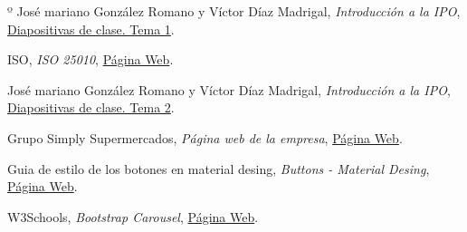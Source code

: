\documentclass[a4paper,11pt]{article}
\begin{document}
\begin{thebibliography}{99}
º
  José mariano González Romano y Víctor Díaz Madrigal,
  \textit{Introducción a la IPO},
  \href{https://s3-eu-central-1.amazonaws.com/learn-eu-central-1-prod-fleet01-xythos/5ac734ed505df/1497177?response-content-disposition=inline%3B%20filename%2A%3DUTF-8%27%27IPO-2018-19-01-Introducci%25C3%25B3n%2520a%2520la%2520IPO.pdf&response-content-type=application%2Fpdf&X-Amz-Algorithm=AWS4-HMAC-SHA256&X-Amz-Date=20181009T201303Z&X-Amz-SignedHeaders=host&X-Amz-Expires=21600&X-Amz-Credential=AKIAIZ3QX2YUHH4EOO3A%2F20181009%2Feu-central-1%2Fs3%2Faws4_request&X-Amz-Signature=91e59768c9f86b77180953691bdcae19f7300073d4ad74d0949de1515d0b6f55}{Diapositivas de clase. Tema 1}.

ISO,
\textit{ISO 25010},
\href{https://iso25000.com/index.php/normas-iso-25000/iso-25010/23-usabilidad}{Página Web}.

José mariano González Romano y Víctor Díaz Madrigal,
\textit{Introducción a la IPO},
\href{https://s3-eu-central-1.amazonaws.com/learn-eu-central-1-prod-fleet01-xythos/5ac734ed505df/1548262?response-content-disposition=inline%3B%20filename%2A%3DUTF-8%27%27IPO-2018-19-02-Usabilidad.pdf&response-content-type=application%2Fpdf&X-Amz-Algorithm=AWS4-HMAC-SHA256&X-Amz-Date=20181009T201947Z&X-Amz-SignedHeaders=host&X-Amz-Expires=21600&X-Amz-Credential=AKIAIZ3QX2YUHH4EOO3A%2F20181009%2Feu-central-1%2Fs3%2Faws4_request&X-Amz-Signature=b0015ef5189a68a14076abd0ef07c9f15c07aa1ef5bebf8a545bf456bbfafe84}{Diapositivas de clase. Tema 2}.

Grupo Simply Supermercados,
\textit{Página web de la empresa},
\href{www.simply.es}{Página Web}.

Guia de estilo de los botones en material desing,
\textit{Buttons - Material Desing},
\href{https://material.io/design/components/buttons.html}{Página Web}.

W3Schools,
\textit{Bootstrap Carousel},
\href{https://www.w3schools.com/bootstrap/bootstrap_carousel.asp}{Página Web}.

\end{thebibliography}
\end{document}
